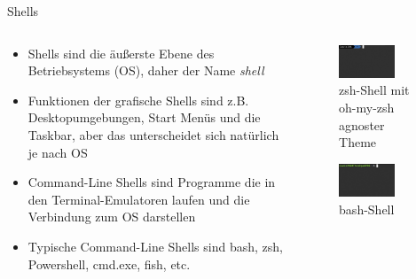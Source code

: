 \begin{frame}{Shells}
  \begin{columns}
    \begin{column}{0.5\textwidth}
      \begin{itemize}
        \item Shells sind die äußerste Ebene des Betriebsystems (OS), daher der Name \textit{shell}
        \item Funktionen der grafische Shells sind z.B. Desktopumgebungen, Start Menüs und die Taskbar, aber das unterscheidet sich natürlich je nach OS 
        \item Command-Line Shells sind Programme die in den Terminal-Emulatoren  laufen und die Verbindung zum OS darstellen
        \item Typische Command-Line Shells sind bash, zsh, Powershell, cmd.exe, fish, etc.
      \end{itemize} 
    \end{column}
    \begin{column}{0.5\textwidth}
      \begin{figure}
        \includegraphics[width=0.7\textwidth]{images/zsh_shell.jpg}
      \caption*{zsh-Shell mit oh-my-zsh agnoster Theme}
      \end{figure}
      \begin{figure}
        \includegraphics[width=0.7\textwidth]{images/bash_shell.jpg}
      \caption*{bash-Shell}
      \end{figure}
    \end{column}
  \end{columns}
  
\end{frame}


